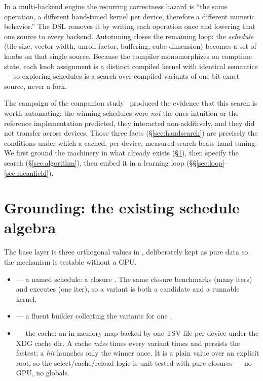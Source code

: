 \documentclass[11pt]{article}
\begin{document}
In a multi-backend engine the recurring correctness hazard is ``the same operation, a different hand-tuned
kernel per device, therefore a different numeric behavior.'' The DSL removes it by writing each operation
once and lowering that one source to every backend. Autotuning closes the remaining loop: the \emph{schedule}
(tile size, vector width, unroll factor, buffering, cube dimension) becomes a set of \code{\#[comptime]}
knobs on that single source. Because the compiler monomorphizes on comptime state, each knob assignment is a
distinct compiled kernel with identical semantics --- so exploring schedules is a search over compiled
variants of one bit-exact source, never a fork.

The campaign of the companion study~\cite{refutation} produced the evidence that this search is worth
automating: the winning schedules were \emph{not} the ones intuition or the reference implementation
predicted, they interacted non-additively, and they did not transfer across devices. Those three facts
(\S\ref{sec:handsearch}) are precisely the conditions under which a cached, per-device, measured search
beats hand-tuning. We first ground the machinery in what already exists (\S\ref{sec:tuners}), then specify
the search (\S\ref{sec:algorithm}), then embed it in a learning loop (\S\S\ref{sec:loop}--\ref{sec:meanfield}).

\section{Grounding: the existing schedule algebra}
\label{sec:tuners}

The base layer is three orthogonal values in , deliberately kept as pure
data so the mechanism is testable without a GPU.

\begin{itemize}[leftmargin=1.4em,itemsep=1pt,topsep=2pt]
\item \textbf{} --- a named schedule: a closure . The same
closure benchmarks (many iters) and executes (one iter), so a variant is both a candidate and a runnable
kernel.
\item \textbf{} --- a fluent builder collecting the variants for one .
\item \textbf{} --- the cache: an in-memory  map backed by
one TSV file per device under the XDG cache dir. A cache \emph{miss} times every variant 
times and persists the fastest; a \emph{hit} launches only the winner once. It is a plain value over an
explicit root, so the select/cache/reload logic is unit-tested with pure closures --- no GPU, no globals.
\end{itemize}
\end{document}
